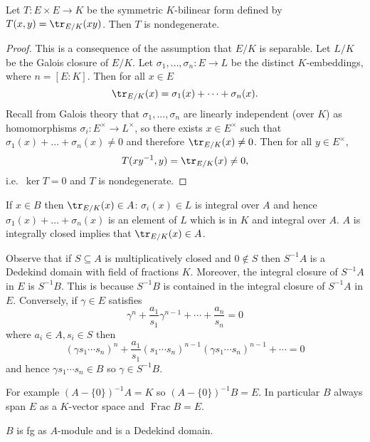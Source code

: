 \documentclass[a4paper]{article}
\DeclareMathOperator{\Frac}{Frac}
\begin{document}
\begin{lemma}
  Let \(T: E \times E \to K\) be the symmetric \(K\)-bilinear form defined by \(T(x, y) = \tr_{E/K} (xy)\). Then \(T\) is nondegenerate.
\end{lemma}

\begin{proof}
  This is a consequence of the assumption that \(E/K\) is separable. Let \(L/K\) be the Galois closure of \(E/K\). Let \(\sigma_1, \dots, \sigma_n: E \to L\) be the distinct \(K\)-embeddings, where \(n = [E: K]\). Then for all \(x \in E\)
  \[
    \tr_{E/K}(x) = \sigma_1(x) + \dots + \sigma_n(x).
  \]
  Recall from Galois theory that \(\sigma_1, \dots, \sigma_n\) are linearly independent (over \(K\)) as homomorphisms \(\sigma_i: E^\times \to L^\times\), so there exists \(x \in E^\times\) such that \(\sigma_1(x) + \dots + \sigma_n(x) \neq 0\) and therefore \(\tr_{E/K}(x) \neq 0\). Then for all \(y \in E^\times\),
  \[
    T(xy^{-1}, y) = \tr_{E/K}(x) \neq 0,
  \]
  i.e.\ \(\ker T = 0\) and \(T\) is nondegenerate.
\end{proof}

\begin{remark}
  If \(x \in B\) then \(\tr_{E/K}(x) \in A\): \(\sigma_i(x) \in L\) is integral over \(A\) and hence \(\sigma_1(x) + \dots + \sigma_n(x)\) is an element of \(L\) which is in \(K\) and integral over \(A\). \(A\) is integrally closed implies that \(\tr_{E/K}(x) \in A\).
\end{remark}

Observe that if \(S \subseteq A\) is multiplicatively closed and \(0 \notin S\) then \(S^{-1}A\) is a Dedekind domain with field of fractions \(K\). Moreover, the integral closure of \(S^{-1}A\) in \(E\) is \(S^{-1}B\). This is because \(S^{-1}B\) is contained in the integral closure of \(S^{-1}A\) in \(E\). Conversely, if \(\gamma \in E\) satisfies
\[
  \gamma^n + \frac{a_1}{s_1} \gamma^{n - 1} + \cdots + \frac{a_n}{s_n} = 0
\]
where \(a_i \in A, s_i \in S\) then
\[
  (\gamma s_1 \cdots s_n)^n + \frac{a_1}{s_1} (s_1 \cdots s_n)^{n - 1} (\gamma s_1 \cdots s_n)^{n - 1} + \cdots = 0
\]
and hence \(\gamma s_1 \cdots s_n \in B\) so \(\gamma \in S^{-1}B\).

For example \((A - \{0\})^{-1} A = K\) so \((A - \{0\})^{-1}B = E\). In particular \(B\) always span \(E\) as a \(K\)-vector space and \(\Frac B = E\).

\begin{proposition}
  \(B\) is fg as \(A\)-module and is a Dedekind domain.
\end{proposition}
\end{document}
